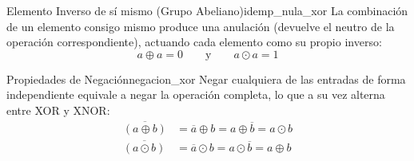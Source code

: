 \begin{teorema}{Elemento Inverso de sí mismo (Grupo Abeliano)}{idemp_nula_xor}
La combinación de un elemento consigo mismo produce una anulación (devuelve el neutro de la operación correspondiente), actuando cada elemento como su propio inverso:
\[ a \oplus a = 0 \qquad \text{y} \qquad a \odot a = 1 \]
\end{teorema}

\begin{teorema}{Propiedades de Negación}{negacion_xor}
Negar cualquiera de las entradas de forma independiente equivale a negar la operación completa, lo que a su vez alterna entre XOR y XNOR:
\begin{align*}
    \overline{(a \oplus b)} &= \overline{a} \oplus b = a \oplus \overline{b} = a \odot b \\
    \overline{(a \odot b)} &= \overline{a} \odot b = a \odot \overline{b} = a \oplus b
\end{align*}
\end{teorema}

